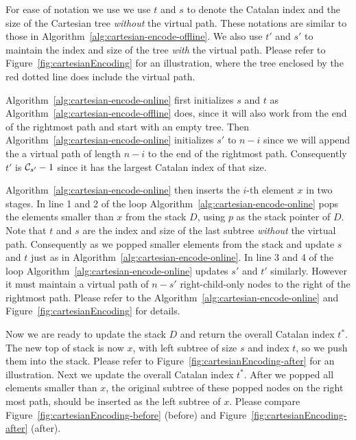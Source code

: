 For ease of notation we use we use $t$ and $s$ to denote the Catalan
index and the size of the Cartesian tree {\em without} the virtual
path.  These notations are similar to those in
Algorithm~\ref{alg:cartesian-encode-offline}.  We also use $t'$ and
$s'$ to maintain the index and size of the tree {\em with} the virtual
path.  Please refer to Figure~\ref{fig:cartesianEncoding} for an
illustration, where the tree enclosed by the red dotted line does
include the virtual path.

Algorithm~\ref{alg:cartesian-encode-online} first initializes $s$ and
$t$ as Algorithm~\ref{alg:cartesian-encode-offline} does, since it
will also work from the end of the rightmost path and start with an
empty tree.  Then Algorithm~\ref{alg:cartesian-encode-online}
initializes $s'$ to $n - i$ since we will append the a virtual path of
length $n - i$ to the end of the rightmost path.  Consequently $t'$ is
${\cal C}_{s'} - 1$ since it has the largest Catalan index of that
size.

Algorithm~\ref{alg:cartesian-encode-online} then inserts the $i$-th
element $x$ in two stages.  In line 1 and 2 of the loop
Algorithm~\ref{alg:cartesian-encode-online} pops the elements smaller
than $x$ from the stack $D$, using $p$ as the stack pointer of $D$.
Note that $t$ and $s$ are the index and size of the last subtree {\em
  without} the virtual path.  Consequently as we popped smaller
elements from the stack and update $s$ and $t$ just as in
Algorithm~\ref{alg:cartesian-encode-online}.  In line 3 and 4 of the
loop Algorithm~\ref{alg:cartesian-encode-online} updates $s'$ and $t'$
similarly.  However it must maintain a virtual path of $n - s'$
right-child-only nodes to the right of the rightmost path.  Please
refer to the Algorithm~\ref{alg:cartesian-encode-online} and
Figure~\ref{fig:cartesianEncoding} for details.



Now we are ready to update the stack $D$ and return the overall
Catalan index $t^*$.  The new top of stack is now $x$, with left
subtree of size $s$ and index $t$, so we push them into the stack.
Please refer to Figure~\ref{fig:cartesianEncoding-after} for an
illustration.  Next we update the overall Catalan index $t^*$.  After
we popped all elements smaller than $x$, the original subtree of these
popped nodes on the right most path, should be inserted as the left
subtree of $x$.  Please compare
Figure~\ref{fig:cartesianEncoding-before} (before) and
Figure~\ref{fig:cartesianEncoding-after} (after).


